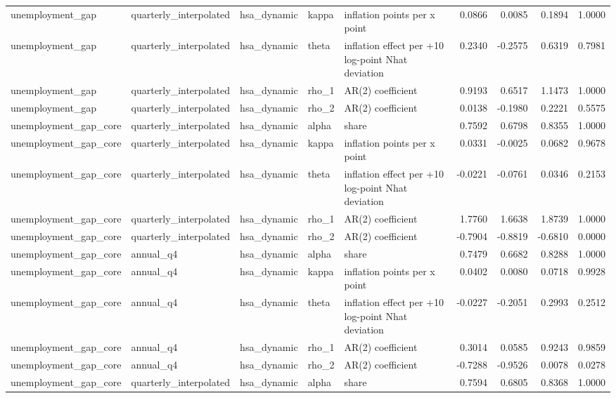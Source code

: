 \begin{tabular}{lllllrrrr}
unemployment\_gap & quarterly\_interpolated & hsa\_dynamic & kappa & inflation points per x point & 0.0866 & 0.0085 & 0.1894 & 1.0000 \\
unemployment\_gap & quarterly\_interpolated & hsa\_dynamic & theta & inflation effect per +10 log-point Nhat deviation & 0.2340 & -0.2575 & 0.6319 & 0.7981 \\
unemployment\_gap & quarterly\_interpolated & hsa\_dynamic & rho\_1 & AR(2) coefficient & 0.9193 & 0.6517 & 1.1473 & 1.0000 \\
unemployment\_gap & quarterly\_interpolated & hsa\_dynamic & rho\_2 & AR(2) coefficient & 0.0138 & -0.1980 & 0.2221 & 0.5575 \\
unemployment\_gap\_core & quarterly\_interpolated & hsa\_dynamic & alpha & share & 0.7592 & 0.6798 & 0.8355 & 1.0000 \\
unemployment\_gap\_core & quarterly\_interpolated & hsa\_dynamic & kappa & inflation points per x point & 0.0331 & -0.0025 & 0.0682 & 0.9678 \\
unemployment\_gap\_core & quarterly\_interpolated & hsa\_dynamic & theta & inflation effect per +10 log-point Nhat deviation & -0.0221 & -0.0761 & 0.0346 & 0.2153 \\
unemployment\_gap\_core & quarterly\_interpolated & hsa\_dynamic & rho\_1 & AR(2) coefficient & 1.7760 & 1.6638 & 1.8739 & 1.0000 \\
unemployment\_gap\_core & quarterly\_interpolated & hsa\_dynamic & rho\_2 & AR(2) coefficient & -0.7904 & -0.8819 & -0.6810 & 0.0000 \\
unemployment\_gap\_core & annual\_q4 & hsa\_dynamic & alpha & share & 0.7479 & 0.6682 & 0.8288 & 1.0000 \\
unemployment\_gap\_core & annual\_q4 & hsa\_dynamic & kappa & inflation points per x point & 0.0402 & 0.0080 & 0.0718 & 0.9928 \\
unemployment\_gap\_core & annual\_q4 & hsa\_dynamic & theta & inflation effect per +10 log-point Nhat deviation & -0.0227 & -0.2051 & 0.2993 & 0.2512 \\
unemployment\_gap\_core & annual\_q4 & hsa\_dynamic & rho\_1 & AR(2) coefficient & 0.3014 & 0.0585 & 0.9243 & 0.9859 \\
unemployment\_gap\_core & annual\_q4 & hsa\_dynamic & rho\_2 & AR(2) coefficient & -0.7288 & -0.9526 & 0.0078 & 0.0278 \\
unemployment\_gap\_core & quarterly\_interpolated & hsa\_dynamic & alpha & share & 0.7594 & 0.6805 & 0.8368 & 1.0000 \\

\end{tabular}
